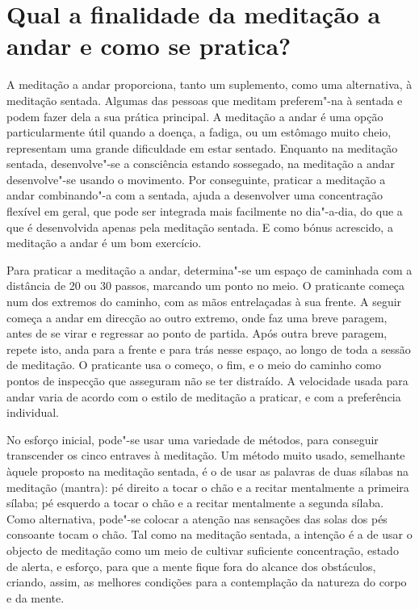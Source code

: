 \section{Qual a finalidade da meditação a andar e como se pratica?}

A meditação a andar proporciona, tanto um suplemento, como uma
alternativa, à meditação sentada. Algumas das pessoas que meditam
preferem"-na à sentada e podem fazer dela a sua prática principal. A
meditação a andar é uma opção particularmente útil quando a doença, a
fadiga, ou um estômago muito cheio, representam uma grande dificuldade
em estar sentado. Enquanto na meditação sentada, desenvolve"-se a
consciência estando sossegado, na meditação a andar desenvolve"-se usando
o movimento. Por conseguinte, praticar a meditação a andar combinando"-a
com a sentada, ajuda a desenvolver uma concentração flexível em geral,
que pode ser integrada mais facilmente no dia"-a-dia, do que a que é
desenvolvida apenas pela meditação sentada. E como bónus acrescido, a
meditação a andar é um bom exercício.

Para praticar a meditação a andar, determina"-se um espaço de caminhada
com a distância de 20 ou 30 passos, marcando um ponto no meio. O
praticante começa num dos extremos do caminho, com as mãos entrelaçadas
à sua frente{.} A seguir começa a andar em direcção ao outro extremo,
onde faz uma breve paragem, antes de se virar e regressar ao ponto de
partida. Após outra breve paragem, repete isto, anda para a frente e
para trás nesse espaço, ao longo de toda a sessão de meditação. O
praticante usa o começo, o fim, e o meio do caminho como pontos de
inspecção que asseguram não se ter distraído. A velocidade usada para
andar varia de acordo com o estilo de meditação a praticar, e com a
preferência individual.

No esforço inicial, pode"-se usar uma variedade de métodos, para
conseguir transcender os cinco entraves à meditação. Um método muito
usado, semelhante àquele proposto na meditação sentada, é o de usar as
palavras de duas sílabas na meditação (mantra): pé direito a tocar o
chão e a recitar mentalmente a primeira sílaba; pé esquerdo a tocar o
chão e a recitar mentalmente a segunda sílaba. Como alternativa, pode"-se
colocar a atenção nas sensações das solas dos pés consoante tocam o
chão. Tal como na meditação sentada, a intenção é a de usar o objecto de
meditação como um meio de cultivar suficiente concentração, estado de
alerta, e esforço, para que a mente fique fora do alcance dos
obstáculos, criando, assim, as melhores condições para a contemplação da
natureza do corpo e da mente.

